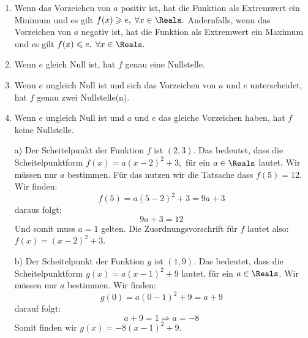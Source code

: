 \documentclass[12pt]{article}
\begin{document}
\begin{solution}
\begin{enumerate}[label=\alph*)]
\item Wenn das Vorzeichen von $a$ positiv ist, hat die Funktion als Extremwert ein Minimum und es gilt $f(x) \geqslant e, \; \forall x \in \Reals.$ Andernfalls, wenn das Vorzeichen von $a$ negativ ist, hat die Funktion als Extremwert ein Maximum und es gilt $f(x) \leqslant e, \; \forall x \in \Reals.$
\item Wenn $e$ gleich Null ist, hat $f$ genau eine Nullstelle.

\item Wenn $e$ ungleich Null ist und sich das Vorzeichen von $a$ und $e$ unterscheidet, hat $f$ genau zwei Nullstelle(n).

\item Wenn $e$ ungleich Null ist und $a$ und $e$ das gleiche Vorzeichen haben, hat $f$ keine Nullstelle.
\end{enumerate}
\end{solution}
\begin{solution}
\begin{enumerate}
\item[a)] Der Scheitelpunkt der Funktion $f$ ist $(2,3)$. Das bedeutet, dass die Scheitelpunktform $f(x)=a(x-2)^{2}+3,$ für ein $a\in \Reals$ lautet. Wir müssen nur $a$ bestimmen. Für das nutzen wir die Tatsache dass $f(5)=12$. Wir finden:
$$f(5)=a(5-2)^{2}+3=9a+3$$
daraus folgt:
$$9a+3=12$$
Und somit muss $a=1$ gelten.
Die Zuordnungsvorschrift für $f$ lautet also: $f(x)=(x-2)^{2}+3$. 
\item[b)] Der Scheitelpunkt der Funktion $g$ ist $(1,9)$. Das bedeutet, dass die Scheitelpunktform $g(x)=a(x-1)^{2}+9$ lautet, für ein $a\in\Reals$. Wir müssen nur $a$ bestimmen. Wir finden: 
$$g(0)=a(0-1)^{2}+9=a+9$$
darauf folgt:
$$a+9 = 1 \Rightarrow a = -8$$
Somit finden wir $g(x)=-8(x-1)^{2}+9$. 
\end{enumerate}
\end{solution}
\end{document}
